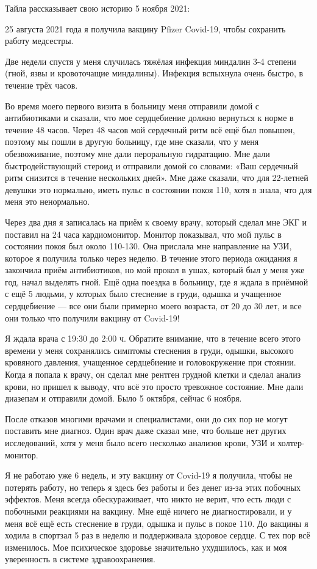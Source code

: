 Тайла рассказывает свою историю 5 ноября 2021:

25 августа 2021 года я получила вакцину Pfizer Covid-19, чтобы сохранить работу
медсестры.

Две недели спустя у меня случилась тяжёлая инфекция миндалин 3-4 степени (гной,
язвы и кровоточащие миндалины). Инфекция вспыхнула очень быстро, в течение трёх
часов.

Во время моего первого визита в больницу меня отправили домой с антибиотиками и
сказали, что мое сердцебиение должно вернуться к норме в течение 48 часов. Через
48 часов мой сердечный ритм всё ещё был повышен, поэтому мы пошли в другую
больницу, где мне сказали, что у меня обезвоживание, поэтому мне дали
пероральную гидратацию. Мне дали быстродействующий стероид и отправили домой со
словами: «Ваш сердечный ритм снизится в течение нескольких дней». Мне даже
сказали, что для 22-летней девушки это нормально, иметь пульс в состоянии покоя
110, хотя я знала, что для меня это ненормально.

Через два дня я записалась на приём к своему врачу, который сделал мне ЭКГ и
поставил на 24 часа кардиомонитор. Монитор показывал, что мой пульс в состоянии
покоя был около 110-130. Она прислала мне направление на УЗИ, которое я получила
только через неделю. В течение этого периода ожидания я закончила приём
антибиотиков, но мой прокол в ушах, который был у меня уже год, начал выделять
гной. Ещё одна поездка в больницу, где я ждала в приёмной с ещё 5 людьми, у
которых было стеснение в груди, одышка и учащенное сердцебиение — все они были
примерно моего возраста, от 20 до 30 лет, и все они только что получили вакцину
от Covid-19!

Я ждала врача с 19:30 до 2:00 ч.  Обратите внимание, что в течение всего этого
времени у меня сохранялись симптомы стеснения в груди, одышки, высокого
кровяного давления, учащенное сердцебиение и головокружение при стоянии. Когда я
попала к врачу, он сделал мне рентген грудной клетки и сделал анализ крови, но
пришел к выводу, что всё это просто тревожное состояние. Мне дали диазепам и
отправили домой. Было 5 октября, сейчас 6 ноября.

После отказов многими врачами и специалистами, они до сих пор не могут поставить
мне диагноз. Один врач даже сказал мне, что больше нет других исследований, хотя
у меня было всего несколько анализов крови, УЗИ и холтер-монитор.

Я не работаю уже 6 недель, и эту вакцину от Covid-19 я получила, чтобы не
потерять работу, но теперь я здесь без работы и без денег из-за этих побочных
эффектов. Меня всегда обескураживает, что никто не верит, что есть люди с
побочными реакциями на вакцину. Мне ещё ничего не диагностировали, и у меня всё
ещё есть стеснение в груди, одышка и пульс в покое 110. До вакцины я ходила в
спортзал 5 раз в неделю и поддерживала здоровое сердце. С тех пор всё
изменилось. Мое психическое здоровье значительно ухудшилось, как и моя
уверенность в системе здравоохранения.

